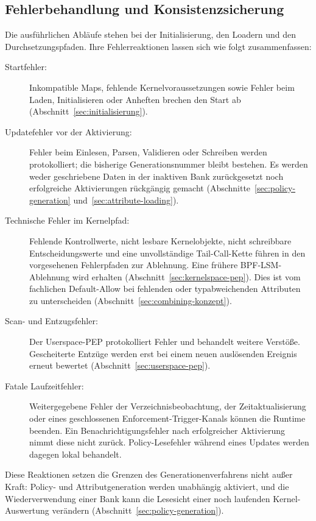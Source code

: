 \subsection{Fehlerbehandlung und Konsistenzsicherung}\label{sec:fehlerbehandlung}
Die ausführlichen Abläufe stehen bei der Initialisierung, den Loadern und den Durchsetzungspfaden. Ihre Fehlerreaktionen lassen sich wie folgt zusammenfassen:
\begin{description}
    \item[Startfehler:] Inkompatible Maps, fehlende Kernelvoraussetzungen sowie Fehler beim Laden, Initialisieren oder Anheften brechen den Start ab (Abschnitt~\ref{sec:initialisierung}).
    \item[Updatefehler vor der Aktivierung:] Fehler beim Einlesen, Parsen, Validieren oder Schreiben werden protokolliert; die bisherige Generationsnummer bleibt bestehen. Es werden weder geschriebene Daten in der inaktiven Bank zurückgesetzt noch erfolgreiche Aktivierungen rückgängig gemacht (Abschnitte~\ref{sec:policy-generation} und~\ref{sec:attribute-loading}).
    \item[Technische Fehler im Kernelpfad:] Fehlende Kontrollwerte, nicht lesbare Kernelobjekte, nicht schreibbare Entscheidungswerte und eine unvollständige Tail-Call-Kette führen in den vorgesehenen Fehlerpfaden zur Ablehnung. Eine frühere BPF-LSM-Ablehnung wird erhalten (Abschnitt~\ref{sec:kernelspace-pep}). Dies ist vom fachlichen Default-Allow bei fehlenden oder typabweichenden Attributen zu unterscheiden (Abschnitt~\ref{sec:combining-konzept}).
    \item[Scan- und Entzugsfehler:] Der Userspace-PEP protokolliert Fehler und behandelt weitere Verstöße. Gescheiterte Entzüge werden erst bei einem neuen auslösenden Ereignis erneut bewertet (Abschnitt~\ref{sec:userspace-pep}).
    \item[Fatale Laufzeitfehler:] Weitergegebene Fehler der Verzeichnisbeobachtung, der Zeitaktualisierung oder eines geschlossenen Enforcement-Trigger-Kanals können die Runtime beenden. Ein Benachrichtigungsfehler nach erfolgreicher Aktivierung nimmt diese nicht zurück. Policy-Lesefehler während eines Updates werden dagegen lokal behandelt.
\end{description}

Diese Reaktionen setzen die Grenzen des Generationenverfahrens nicht außer Kraft: Policy- und Attributgeneration werden unabhängig aktiviert, und die Wiederverwendung einer Bank kann die Lesesicht einer noch laufenden Kernel-Auswertung verändern (Abschnitt~\ref{sec:policy-generation}).

